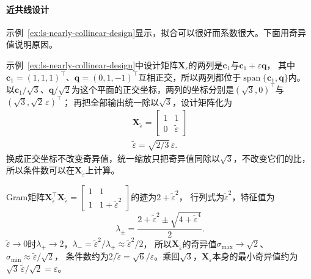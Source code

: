 \paragraph{近共线设计}

示例~\ref{ex:ls-nearly-collinear-design}显示，拟合可以很好而系数很大。下面用奇异值说明原因。

\begin{example}[近共线设计的奇异值]
\label{ex:ls-nearly-collinear-singular-values}
示例~\ref{ex:ls-nearly-collinear-design}中设计矩阵$\bm X_\varepsilon$的两列是$\bm c_1$与$\bm c_1+\varepsilon\bm q$，
其中$\bm c_1=(1,1,1)^\top$、$\bm q=(0,1,-1)^\top$互相正交，所以两列都位于$\operatorname{span}\{\bm c_1,\bm q\}$内。
以$\bm c_1/\sqrt3$、$\bm q/\sqrt2$为这个平面的正交坐标，两列的坐标分别是$(\sqrt3,0)^\top$与$(\sqrt3,\sqrt2\,\varepsilon)^\top$；
再把全部输出统一除以$\sqrt3$，设计矩阵化为
\begin{equation}
\begin{gathered}
\bm X_{\widetilde\varepsilon}
 =\begin{bmatrix}1&1\\0&\widetilde\varepsilon\end{bmatrix}\\
\widetilde\varepsilon=\sqrt{2/3}\,\varepsilon .
\end{gathered}
\label{eq:matrix-analysis-nearly-collinear-design}
\end{equation}
换成正交坐标不改变奇异值，统一缩放只把奇异值同除以$\sqrt3$，不改变它们的比，所以条件数可以在$\bm X_{\widetilde\varepsilon}$上计算。

Gram矩阵$\bm X_{\widetilde\varepsilon}^\top\bm X_{\widetilde\varepsilon}=\left[\begin{smallmatrix}1&1\\1&1+\widetilde\varepsilon^2\end{smallmatrix}\right]$的迹为$2+\widetilde\varepsilon^2$，
行列式为$\widetilde\varepsilon^2$，特征值为
\begin{equation}
 \lambda_\pm
 =\frac{2+\widetilde\varepsilon^2
          \mathbin{\pm}\sqrt{4+\widetilde\varepsilon^4}}{2}.
 \label{eq:matrix-analysis-nearly-collinear-gram-eigenvalues}
\end{equation}
$\widetilde\varepsilon\to0$时$\lambda_+\to2$，$\lambda_-=\widetilde\varepsilon^2/\lambda_+\approx\widetilde\varepsilon^2/2$，
所以$\bm X_{\widetilde\varepsilon}$的奇异值$\sigma_{\max}\to\sqrt2$、$\sigma_{\min}\approx\widetilde\varepsilon/\sqrt2$，
条件数约为$2/\widetilde\varepsilon=\sqrt6/\varepsilon$。乘回$\sqrt3$，$\bm X_\varepsilon$本身的最小奇异值约为$\sqrt3\,\widetilde\varepsilon/\sqrt2=\varepsilon$。
\end{example}

